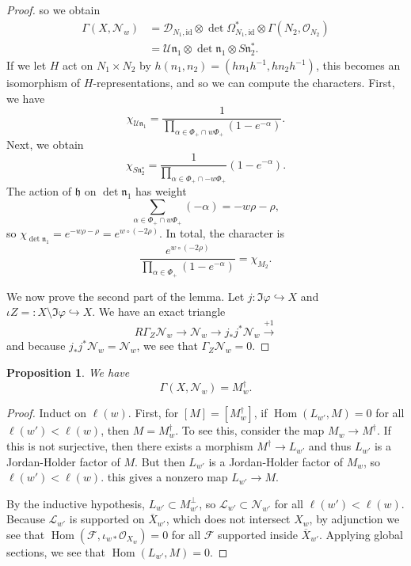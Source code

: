 \documentclass[leqno, openany]{memoir}
\newtheorem{prop}[thm]{Proposition}
\theoremstyle{definition}
\theoremstyle{remark}
\theoremstyle{plain}
\theoremstyle{definition}
\theoremstyle{remark}
\newcommand{\U}{\mathcal{U}}
\newcommand{\h}{\mathfrak{h}}
\newcommand{\mc}[1]{\mathcal{#1}}
\newcommand{\mf}[1]{\mathfrak{#1}}
\newcommand{\mr}[1]{\mathrm{#1}}
\newcommand{\ol}[1]{\overline{#1}}
\DeclareMathOperator{\Hom}{Hom}
\begin{document}
\begin{proof}
    so we obtain
    \begin{align*}
        \Gamma(X, \mc{N}_w) &= \mc{D}_{N_1, \mr{id}} \otimes \det \Omega_{N_1, \mr{id}}^* \otimes \Gamma(N_2, \mc{O}_{N_2}) \\
        &= \U \mf{n}_1 \otimes \det \mf{n}_1 \otimes S \mf{n}_2^*.
    \end{align*}
    If we let $H$ act on $N_1 \times N_2$ by $h(n_1, n_2) = (h n_1 h^{-1}, h n_2 h^{-1})$, this becomes an isomorphism of $H$-representations, and so we can compute the characters. First, we have
    \[ \chi_{\U \mf{n}_1} = \frac{1}{\prod_{\alpha \in \Phi_+ \cap w \Phi_+} (1-e^{-\alpha})}. \]
    Next, we obtain
    \[ \chi_{S \mf{n}_2^*} = \frac{1}{\prod_{\alpha \in \Phi_+ \cap -w\Phi_+}}(1-e^{-\alpha}). \]
    The action of $\h$ on $\det \mf{n}_1$ has weight
    \[ \sum_{\alpha \in \Phi_+ \cap w \Phi_+} (-\alpha) = -w \rho - \rho, \]
    so $\chi_{\det \mf{n}_1} = e^{-w \rho - \rho} = e^{w \circ (-2\rho)}$. In total, the character is
    \[ \frac{e^{w \circ (-2\rho)}}{\prod_{\alpha \in \Phi_+} (1-e^{-\alpha})} = \chi_{M_2}. \]

    We now prove the second part of the lemma. Let $j \colon \Im \varphi \hookrightarrow X$ and $\iota Z = \colon X \setminus \Im \varphi \hookrightarrow X$. We have an exact triangle
    \[ R \Gamma_Z \mc{N}_w \to \mc{N}_w \to j_* j^* \mc{N}_w \xrightarrow{+1} \]
    and because $j_* j^* \mc{N}_w = \mc{N}_w$, we see that $\Gamma_Z \mc{N}_w = 0$. 
\end{proof}

\begin{prop}
    We have 
    \[ \Gamma(X, \mc{N}_w) = M_w^{\dag}. \]
\end{prop}

\begin{proof}
    Induct on $\ell(w)$. First, for $[M] = [M_w^{\dag}]$, if $\Hom(L_{w'}, M) = 0$ for all $\ell(w') < \ell(w)$, then $M = M_w^{\dag}$. To see this, consider the map $M_w \to M^{\dag}$. If this is not surjective, then there exists a morphism $M^{\dag} \to L_{w'}$ and thus $L_{w'}$ is a Jordan-Holder factor of $M$. But then $L_{w'}$ is a Jordan-Holder factor of $M_w$, so $\ell(w') < \ell(w)$. this gives a nonzero map $L_{w'} \to M$.

    By the inductive hypothesis, $L_{w'} \subset M_{w'}^{\perp}$, so $\mc{L}_{w'} \subset \mc{N}_{w'}$ for all $\ell(w') < \ell(w)$. Because $\mc{L}_{w'}$ is supported on $\ol{X}_{w'}$, which does not intersect $X_w$, by adjunction we see that $\Hom(\mc{F}, \iota_{w*} \mc{O}_{X_w}) = 0$ for all $\mc{F}$ supported inside $\ol{X}_{w'}$. Applying global sections, we see that $\Hom(L_{w'}, M) = 0$.
\end{proof}
\end{document}
